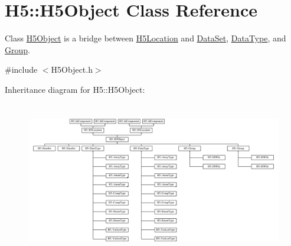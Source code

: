 \hypertarget{class_h5_1_1_h5_object}{}\section{H5\+:\+:H5\+Object Class Reference}
\label{class_h5_1_1_h5_object}


Class \hyperlink{class_h5_1_1_h5_object}{H5\+Object} is a bridge between \hyperlink{class_h5_1_1_h5_location}{H5\+Location} and \hyperlink{class_h5_1_1_data_set}{Data\+Set}, \hyperlink{class_h5_1_1_data_type}{Data\+Type}, and \hyperlink{class_h5_1_1_group}{Group}.  




{\ttfamily \#include $<$H5\+Object.\+h$>$}

Inheritance diagram for H5\+:\+:H5\+Object\+:\begin{figure}[H]
\begin{center}
\leavevmode
\includegraphics[height=6.817391cm]{class_h5_1_1_h5_object}
\end{center}
\end{figure}
